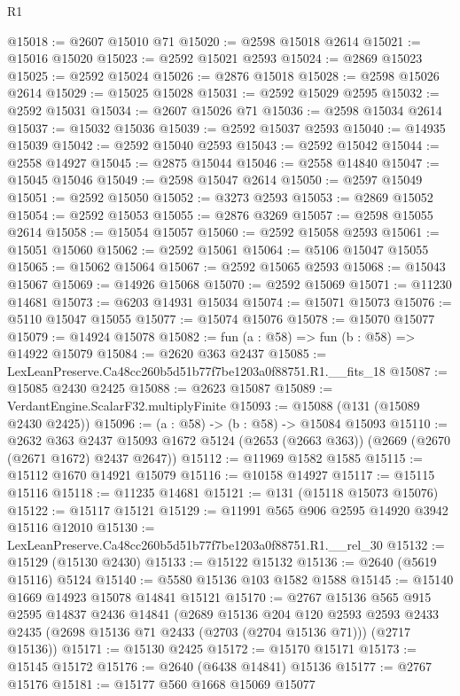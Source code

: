 \begin{lexlean}{R1}
\begin{coremodule}
@15018 := @2607 @15010 @71
@15020 := @2598 @15018 @2614
@15021 := @15016 @15020
@15023 := @2592 @15021 @2593
@15024 := @2869 @15023
@15025 := @2592 @15024
@15026 := @2876 @15018
@15028 := @2598 @15026 @2614
@15029 := @15025 @15028
@15031 := @2592 @15029 @2595
@15032 := @2592 @15031
@15034 := @2607 @15026 @71
@15036 := @2598 @15034 @2614
@15037 := @15032 @15036
@15039 := @2592 @15037 @2593
@15040 := @14935 @15039
@15042 := @2592 @15040 @2593
@15043 := @2592 @15042
@15044 := @2558 @14927
@15045 := @2875 @15044
@15046 := @2558 @14840
@15047 := @15045 @15046
@15049 := @2598 @15047 @2614
@15050 := @2597 @15049
@15051 := @2592 @15050
@15052 := @3273 @2593
@15053 := @2869 @15052
@15054 := @2592 @15053
@15055 := @2876 @3269
@15057 := @2598 @15055 @2614
@15058 := @15054 @15057
@15060 := @2592 @15058 @2593
@15061 := @15051 @15060
@15062 := @2592 @15061
@15064 := @5106 @15047 @15055
@15065 := @15062 @15064
@15067 := @2592 @15065 @2593
@15068 := @15043 @15067
@15069 := @14926 @15068
@15070 := @2592 @15069
@15071 := @11230 @14681
@15073 := @6203 @14931 @15034
@15074 := @15071 @15073
@15076 := @5110 @15047 @15055
@15077 := @15074 @15076
@15078 := @15070 @15077
@15079 := @14924 @15078
@15082 := fun (a : @58) => fun (b : @58) => @14922 @15079
@15084 := @2620 @363 @2437
@15085 := LexLeanPreserve.Ca48cc260b5d51b77f7be1203a0f88751.R1.__fits_18
@15087 := @15085 @2430 @2425
@15088 := @2623 @15087
@15089 := VerdantEngine.ScalarF32.multiplyFinite
@15093 := @15088 (@131 (@15089 @2430 @2425))
@15096 := (a : @58) -> (b : @58) -> @15084 @15093
@15110 := @2632
    @363
    @2437
    @15093
    @1672
    @5124
    (@2653 (@2663 @363))
    (@2669 (@2670 (@2671 @1672) @2437 @2647))
@15112 := @11969 @1582 @1585
@15115 := @15112 @1670 @14921 @15079
@15116 := @10158 @14927
@15117 := @15115 @15116
@15118 := @11235 @14681
@15121 := @131 (@15118 @15073 @15076)
@15122 := @15117 @15121
@15129 := @11991 @565 @906 @2595 @14920 @3942 @15116 @12010
@15130 := LexLeanPreserve.Ca48cc260b5d51b77f7be1203a0f88751.R1.__rel_30
@15132 := @15129 (@15130 @2430)
@15133 := @15122 @15132
@15136 := @2640 (@5619 @15116) @5124
@15140 := @5580 @15136 @103 @1582 @1588
@15145 := @15140 @1669 @14923 @15078 @14841 @15121
@15170 := @2767
    @15136
    @565
    @915
    @2595
    @14837
    @2436
    @14841
    (@2689
      @15136
      @204
      @120
      @2593
      @2593
      @2433
      @2435
      (@2698 @15136 @71 @2433 (@2703 (@2704 @15136 @71)))
      (@2717 @15136))
@15171 := @15130 @2425
@15172 := @15170 @15171
@15173 := @15145 @15172
@15176 := @2640 (@6438 @14841) @15136
@15177 := @2767 @15176
@15181 := @15177 @560 @1668 @15069 @15077

\end{coremodule}
\end{lexlean}
